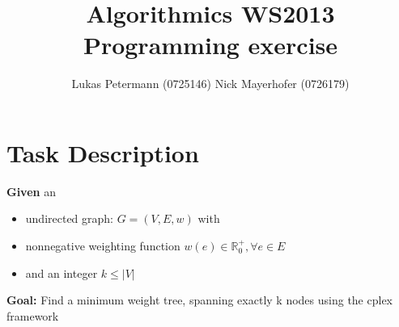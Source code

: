 \documentclass[a4paper,11pt]{article}
\title{Algorithmics WS2013 Programming exercise}
\author{Lukas Petermann (0725146) \quad Nick Mayerhofer (0726179)}
\begin{document}
\maketitle
\tableofcontents

\newpage
\section{Task Description}
\textbf{Given} an 
\begin{itemize}
  \item undirected graph: $G=(V,E,w)$ with
  \item nonnegative weighting function $ w(e) \in \mathbb{R}_0^+ , \forall e \in E$
  \item and an integer $k \leq |V|$
\end{itemize}

\textbf{Goal:}
Find a minimum weight tree, spanning exactly k nodes using the cplex framework






\end{document}
